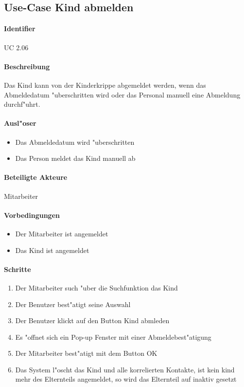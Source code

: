   \newpage
 \subsection{Use-Case Kind abmelden}
  \paragraph{Identifier}
  UC 2.06
  \paragraph{Beschreibung}
  Das Kind kann von der Kinderkrippe abgemeldet werden, wenn das Abmeldedatum "uberschritten wird oder das Personal manuell eine Abmeldung durchf"uhrt.
  \paragraph{Ausl"oser}
  \begin{itemize}
   \item Das Abmeldedatum wird "uberschritten
   \item Das Person meldet das Kind manuell ab
  \end{itemize}

  \paragraph{Beteiligte Akteure}   \leavevmode \newline
    Mitarbeiter
  \paragraph{Vorbedingungen}
  \begin{itemize}
   \item Der Mitarbeiter ist angemeldet
   \item Das Kind ist angemeldet
  \end{itemize}

  \paragraph{Schritte}
  \begin{enumerate}
   \item Der Mitarbeiter such "uber die Suchfunktion das Kind
   \item Der Benutzer best"atigt seine Auswahl
   \item Der Benutzer klickt auf den Button \dq Kind abmleden\dq
   \item Es "offnet sich ein Pop-up Fenster mit einer Abmeldebest"atigung
   \item Der Mitarbeiter best"atigt mit dem Button \dq OK\dq
   \item Das System l"oscht das Kind und alle korrelierten Kontakte, ist kein kind mehr des Elternteils angemeldet, so wird das Elternteil auf inaktiv gesetzt
  \end{enumerate}


